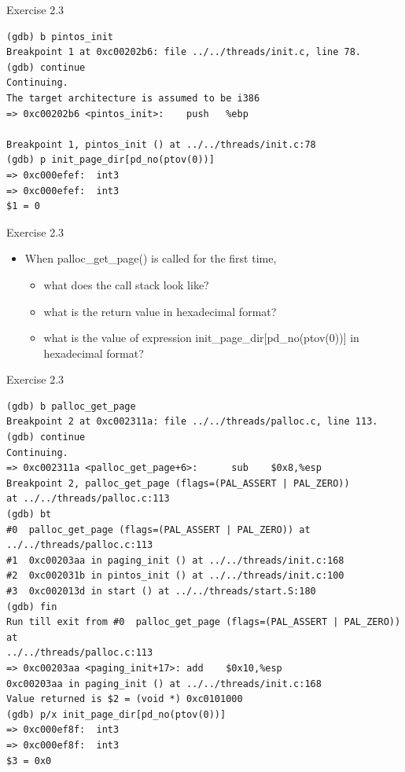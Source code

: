 \documentclass[14pt]{beamer}
\begin{document}
\begin{frame}[fragile]{Exercise 2.3}
\begin{block}{}
    \begin{lstlisting}
(gdb) b pintos_init
Breakpoint 1 at 0xc00202b6: file ../../threads/init.c, line 78.
(gdb) continue
Continuing.
The target architecture is assumed to be i386
=> 0xc00202b6 <pintos_init>:    push   %ebp

Breakpoint 1, pintos_init () at ../../threads/init.c:78
(gdb) p init_page_dir[pd_no(ptov(0))]
=> 0xc000efef:  int3   
=> 0xc000efef:  int3   
$1 = 0
    \end{lstlisting}
\end{block}
\end{frame}
\begin{frame}[fragile]{Exercise 2.3}
\begin{itemize}
    \item When palloc\_get\_page() is called for the first time,
\begin{itemize}
    \item what does the call stack look like?

\item what is the return value in hexadecimal format?

\item  what is the value of expression init\_page\_dir[pd\_no(ptov(0))] in hexadecimal format?
\end{itemize}

\end{itemize}
\end{frame}
\begin{frame}[fragile]{Exercise 2.3}
    \begin{lstlisting}
(gdb) b palloc_get_page
Breakpoint 2 at 0xc002311a: file ../../threads/palloc.c, line 113.
(gdb) continue
Continuing.
=> 0xc002311a <palloc_get_page+6>:      sub    $0x8,%esp
Breakpoint 2, palloc_get_page (flags=(PAL_ASSERT | PAL_ZERO))
at ../../threads/palloc.c:113
(gdb) bt
#0  palloc_get_page (flags=(PAL_ASSERT | PAL_ZERO)) at 
../../threads/palloc.c:113
#1  0xc00203aa in paging_init () at ../../threads/init.c:168
#2  0xc002031b in pintos_init () at ../../threads/init.c:100
#3  0xc002013d in start () at ../../threads/start.S:180
(gdb) fin
Run till exit from #0  palloc_get_page (flags=(PAL_ASSERT | PAL_ZERO)) at 
../../threads/palloc.c:113
=> 0xc00203aa <paging_init+17>: add    $0x10,%esp
0xc00203aa in paging_init () at ../../threads/init.c:168
Value returned is $2 = (void *) 0xc0101000
(gdb) p/x init_page_dir[pd_no(ptov(0))]
=> 0xc000ef8f:  int3   
=> 0xc000ef8f:  int3   
$3 = 0x0
    \end{lstlisting}
\end{frame}
\end{document}
